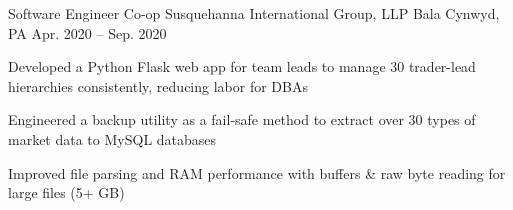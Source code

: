 \begin{cventries}
  \cventry
  {Software Engineer Co-op} %
  {Susquehanna International Group, LLP} %
  {Bala Cynwyd, PA} %
  {Apr. 2020 -- Sep. 2020} %
  {
    \begin{cvitems} %
      \item {Developed a Python Flask web app for team leads to manage 30 trader-lead hierarchies consistently, reducing labor for DBAs}
      \item {Engineered a backup utility as a fail-safe method to extract over 30 types of market data to MySQL databases}
      \item {Improved file parsing and RAM performance with buffers \& raw byte reading for large files (5+ GB)}
    \end{cvitems}
  }


\end{cventries}
